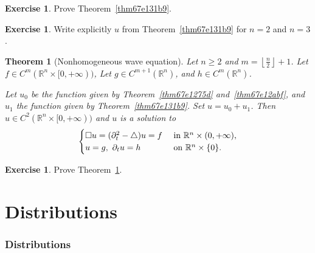\documentclass[a4paper,9pt]{amsart}
\newcommand{\R}{\mathbb{R}}	%
\newcommand{\de}{\partial}		%
\newcommand{\laplacian}{\triangle}
\theoremstyle{plain}
\newtheorem{theorem}[proposition]{Theorem}
\theoremstyle{definition}
\newtheorem{exercise}[proposition]{Exercise}%
\theoremstyle{remark}
\begin{document}
\begin{exercise}
	Prove Theorem~\ref{thm67e131b9}.
\end{exercise}

\begin{exercise}
	Write explicitly $u$ from Theorem~\ref{thm67e131b9} for $n=2$ and $n=3$.
\end{exercise}

\begin{theorem}[Nonhomogeneous wave equation]\label{thm67e132f7}
	Let $n\ge2$ and $m=\left\lfloor \frac{n}{2} \right\rfloor + 1$.
	Let $f\in C^m (\R^n\times[0,+\infty))$,
	Let $g\in C^{m+1}(\R^n)$, and $h\in C^m(\R^n)$.
	
	Let $u_0$ be the function given by Theorem~\ref{thm67e1275d} and~\ref{thm67e12abf},
	and $u_1$ the function given by Theorem~\ref{thm67e131b9}.
	Set $u=u_0+u_1$.
	Then $u \in C^2(\R^n\times[0,+\infty))$ and $u$ is a solution to
	\begin{equation}
	\begin{cases}
		\waveop u = ( \de_t^2-\laplacian )u = f & \text{ in }\R^n\times(0,+\infty) , \\
		u = g,\ \de_t u = h & \text{ on }\R^n\times\{0\} .
	\end{cases}
	\end{equation}
\end{theorem}

\begin{exercise}
	Prove Theorem~\ref{thm67e132f7}.
\end{exercise}

























\newpage
\part{Distributions}



\section{Distributions}
\end{document}
